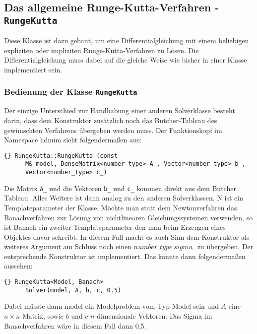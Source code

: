 \documentclass[a4paper,11pt]{article}
\theoremstyle{definition}
\begin{document}
\subsection{Das allgemeine Runge-Kutta-Verfahren - \lstinline{RungeKutta}}
Diese Klasse ist dazu gebaut, um eine Differentialgleichung mit einem
beliebigen expliziten oder impliziten Runge-Kutta-Verfahren zu
Lösen. Die Differentialgleichung muss dabei auf die gleiche Weise wie
bisher in einer Klasse implementiert sein.

\subsubsection{Bedienung der Klasse \lstinline{RungeKutta}}
Der einzige Unterschied zur Handhabung einer anderen Solverklasse
besteht darin, dass dem Konstruktor zusätzlich noch das
Butcher-Tableau des gewünschten Verfahrens übergeben werden muss. Der
Funktionskopf im Namespace hdnum sieht folgendermaßen aus:
{\footnotesize{\begin{lstlisting}{} RungeKutta::RungeKutta (const
      M& model, DenseMatrix<number_type> A_, Vector<number_type> b_,
      Vector<number_type> c_)
\end{lstlisting}}}

Die Matrix \lstinline{A_} und die Vektoren \lstinline{b_} und
\lstinline{c_} kommen direkt aus dem Butcher Tableau. Alles Weitere
ist dann analog zu den anderen Solverklassen. N ist ein
Templateparameter der Klasse. Möchte man statt dem Newtonverfahren das
Banachverfahren zur Lösung von nichtlinearen Gleichungssystemen
verwenden, so ist Banach ein zweiter Templateparameter den man beim
Erzeugen eines Objektes davor schreibt. In diesem Fall macht es auch
Sinn dem Konstruktor als weiteres Argument am Schluss noch einen
$number\_type \ sigma\_$ zu übergeben. Der entsprechende Konstruktor
ist implementiert.  Das könnte dann folgendermaßen aussehen:
{\footnotesize{\begin{lstlisting}{} RungeKutta<Model, Banach>
      Solver(model, A, b, c, 0.5)
\end{lstlisting}}}

Dabei müsste dann model ein Modelproblem vom Typ Model sein und $A$ eine
$n \times n$ Matrix, sowie $b$ und $c$ $n$-dimensionale Vektoren. Das
Sigma im Banachverfahren wäre in diesem Fall dann 0,5.
\end{document}
